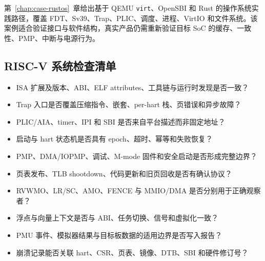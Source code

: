 第~\ref{chap:case-rustos}~章给出基于 QEMU \texttt{virt}、OpenSBI 和 Rust 的操作系统实践路径，覆盖 FDT、Sv39、Trap、PLIC、调度、进程、VirtIO 和文件系统。该案例适合验证接口与软件结构，真实产品仍需重新验证目标 SoC 的缓存、一致性、PMP、中断与电源行为。

\subsection{RISC-V 系统检查清单}

\begin{itemize}
  \item ISA 扩展及版本、ABI、ELF attributes、工具链与运行时发现是否一致？
  \item Trap 入口是否覆盖压缩指令、嵌套、per-hart 栈、页错误和异步故障？
  \item PLIC/AIA、timer、IPI 和 SBI 是否来自平台描述而非固定地址？
  \item 启动与 hart 状态机是否具有 epoch、超时、幂等和失败恢复？
  \item PMP、DMA/IOPMP、调试、M-mode 固件和安全启动是否形成完整边界？
  \item 页表发布、TLB shootdown、代码更新和旧页回收是否有确认协议？
  \item RVWMO、LR/SC、AMO、FENCE 与 MMIO/DMA 是否分别用于正确观察者？
  \item 浮点与向量上下文是否与 ABI、任务切换、信号和虚拟化一致？
  \item PMU 事件、模拟器结果与目标板数据的适用边界是否写入报告？
  \item 崩溃记录能否关联 hart、CSR、页表、镜像、DTB、SBI 和硬件修订号？
\end{itemize}
